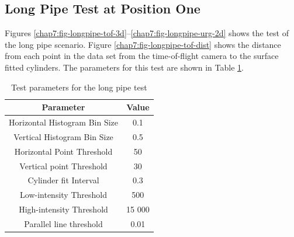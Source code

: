 \subsection{Long Pipe Test at Position One}
Figures \ref{chap7:fig-longpipe-tof-3d}--\ref{chap7:fig-longpipe-urg-2d} shows the test of
the long pipe scenario. Figure \ref{chap7:fig-longpipe-tof-dist} shows the distance from each
point in the data set from the time-of-flight camera to the surface fitted cylinders. The
parameters for this test are shown in Table \ref{chap7:tab-longpipe}.
\begin{table}[htbp]
    \centering
    \begin{tabular}{|c|c|}
        \hline
        Parameter   &   Value   \\
        \hline
        Horizontal Histogram Bin Size & 0.1 \\
        Vertical Histogram Bin Size & 0.5 \\
        Horizontal Point Threshold & 50 \\
        Vertical point Threshold & 30 \\
        \hline
        Cylinder fit Interval & 0.3 \\
        Low-intensity Threshold & 500 \\
        High-intensity Threshold & 15 000 \\
        \hline
        Parallel line threshold & 0.01 \\
        \hline
    \end{tabular}
    \caption{Test parameters for the long pipe test}
    \label{chap7:tab-longpipe}
\end{table}

